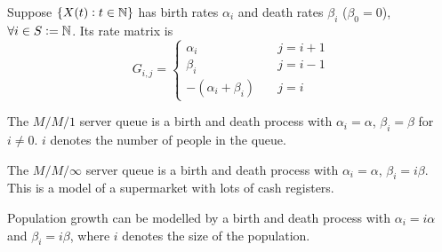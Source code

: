 \begin{example}
    Suppose  $\{X(t): t \in \mathbb{N}\}$ has birth rates $\alpha_i$ and death rates $\beta_i$ ($\beta_0 = 0$), $\forall i \in S := \mathbb{N}$. Its rate matrix is 
    \begin{equation*}
        G_{i,j} = \begin{cases}
            \alpha_i \quad & j = i+1 \\ 
            \beta_i \quad & j = i-1 \\ 
            -(\alpha_i + \beta_i) \quad & j = i
        \end{cases}
    \end{equation*}
\end{example}

\begin{example}
    The $M/M/1$ server queue is a birth and death process with $\alpha_i = \alpha$, $\beta_i = \beta$ for $i \neq 0$. $i$ denotes the number of people in the queue.
\end{example}

\begin{example}
    The $M/M/\infty$ server queue is a birth and death process with $\alpha_i = \alpha$, $\beta_i = i \beta$. This is a model of a supermarket with lots of cash registers.
\end{example}

\begin{example}
    Population growth can be modelled by a birth and death process with $\alpha_i = i \alpha$ and $\beta_i = i \beta$, where $i$ denotes the size of the population.
\end{example}